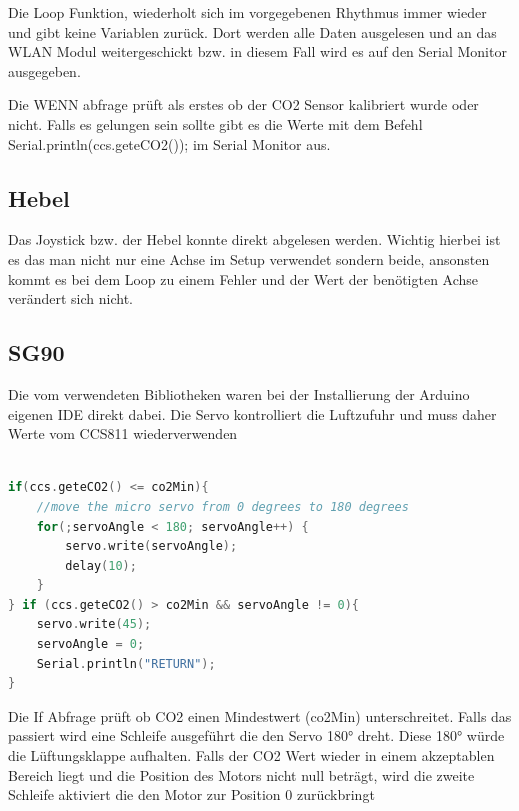 \cite{CCS811man}



Die Loop Funktion, wiederholt sich im vorgegebenen Rhythmus immer wieder und gibt keine Variablen zurück. Dort werden alle Daten ausgelesen und an das WLAN Modul weitergeschickt bzw. in diesem Fall wird es auf den Serial Monitor ausgegeben.

Die WENN abfrage prüft als erstes ob der CO2 Sensor kalibriert wurde oder nicht. Falls es gelungen sein sollte gibt es die Werte mit dem Befehl Serial.println(ccs.geteCO2()); im Serial Monitor aus.

\subsection{Hebel}

Das Joystick bzw. der Hebel konnte direkt abgelesen werden. Wichtig hierbei ist es das man nicht nur eine Achse im Setup verwendet sondern beide, ansonsten kommt es bei dem Loop zu einem Fehler und der Wert der benötigten Achse verändert sich nicht.


\subsection{SG90}

Die vom verwendeten Bibliotheken waren bei der Installierung der Arduino eigenen IDE direkt dabei. Die Servo kontrolliert die Luftzufuhr und muss daher Werte vom CCS811 wiederverwenden

\begin{lstlisting}[language=C, caption=Automatisierten Servobewegung bei zu niedrigen CO2 Werten, label=code:SG90]

if(ccs.geteCO2() <= co2Min){
	//move the micro servo from 0 degrees to 180 degrees
	for(;servoAngle < 180; servoAngle++) {       
		servo.write(servoAngle);              
		delay(10);
	} 
} if (ccs.geteCO2() > co2Min && servoAngle != 0){
	servo.write(45); 
	servoAngle = 0;
	Serial.println("RETURN");
}
\end{lstlisting}
\cite{SG90tut}

Die If Abfrage prüft ob CO2 einen Mindestwert (co2Min) unterschreitet. Falls das passiert  wird eine Schleife ausgeführt die den Servo 180° dreht. Diese 180° würde die Lüftungsklappe aufhalten. Falls der CO2 Wert wieder in einem akzeptablen Bereich liegt und die Position des Motors nicht null beträgt, wird die zweite Schleife aktiviert die den Motor zur Position 0 zurückbringt 


